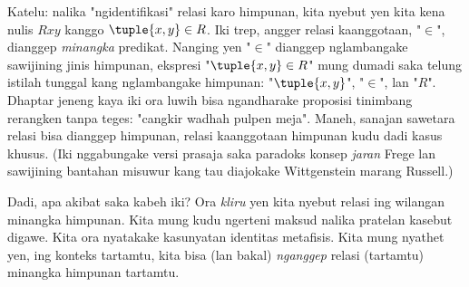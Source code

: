 \documentclass[../../../include/open-logic-section]{subfiles}
\begin{document}
Katelu: nalika "ngidentifikasi" relasi karo himpunan,
kita nyebut yen kita kena nulis $Rxy$ kanggo
$\tuple{x,y} \in R$. Iki trep, angger relasi kaanggotaan,
"$\in$", dianggep \emph{minangka} predikat.
Nanging yen "$\in$" dianggep nglambangake sawijining jinis
himpunan, ekspresi "$\tuple{x,y} \in R$" mung dumadi saka
telung istilah tunggal kang nglambangake himpunan:
"$\tuple{x,y}$", "$\in$", lan "$R$".
Dhaptar jeneng kaya iki ora luwih bisa ngandharake proposisi
tinimbang rerangken tanpa teges: "cangkir wadhah pulpen meja".
Maneh, sanajan sawetara relasi bisa dianggep himpunan,
relasi kaanggotaan himpunan kudu dadi kasus khusus.
(Iki nggabungake versi prasaja saka paradoks konsep
\emph{jaran} Frege lan sawijining bantahan misuwur
kang tau diajokake Wittgenstein marang Russell.)

Dadi, apa akibat saka kabeh iki? Ora \emph{kliru}
yen kita nyebut relasi ing wilangan minangka himpunan.
Kita mung kudu ngerteni maksud nalika pratelan kasebut digawe.
Kita ora nyatakake kasunyatan identitas metafisis.
Kita mung nyathet yen, ing konteks tartamtu, kita bisa
(lan bakal) \emph{nganggep} relasi (tartamtu) minangka
himpunan tartamtu.
\end{document}
